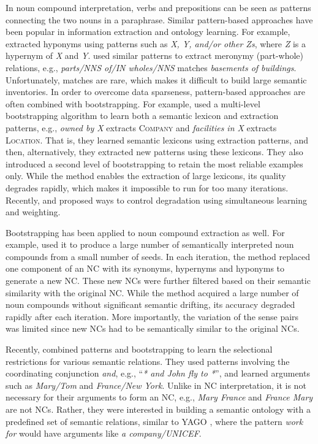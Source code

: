 \documentclass[letterpaper,11pt]{article}
\begin{document}
In noun compound interpretation, verbs and prepositions can be seen as patterns connecting the two nouns in a paraphrase. Similar pattern-based approaches have been popular in  information extraction  and  ontology   learning.
For example,
   extracted hyponyms   using  patterns such as
\textit{X, Y,  and/or other  Zs},
where  \textit{Z} is a hypernym of \textit{X} and \textit{Y}.
 used similar patterns to extract meronymy (part-whole) relations,
e.g., \textit{parts/NNS of/IN wholes/NNS} matches \textit{basements of buildings}.
Unfortunately, matches  are rare,  which makes  it difficult  to build
large  semantic inventories.  In  order to  overcome data  sparseness,
pattern-based approaches are often combined with bootstrapping.
For example,  used a multi-level bootstrapping
algorithm to learn both a semantic lexicon and extraction patterns,
e.g., \textit{owned by X} extracts \textsc{Company}
and \textit{facilities in X} extracts \textsc{Location}.
That is, they learned semantic lexicons using extraction patterns, and
then, alternatively, they extracted new patterns using these lexicons.
They also introduced a second level of bootstrapping to retain
the  most  reliable  examples  only.  While  the  method  enables  the
extraction of large lexicons,
its quality  degrades rapidly,  which makes it impossible  to run
for  too many  iterations.  Recently,   and
  proposed ways  to  control degradation  using
simultaneous learning and weighting.

Bootstrapping has  been applied to  noun compound extraction  as well.
For example,   used it to produce a  large number of
semantically interpreted noun compounds from  a small number of seeds.
In each iteration, the method replaced one component of an NC with its
synonyms, hypernyms and  hyponyms to generate a new NC.  These new NCs
were  further filtered  based on  their semantic  similarity with  the
original  NC.  While  the  method  acquired a  large  number  of  noun
compounds without significant semantic drifting, its accuracy degraded
rapidly  after each  iteration.
More importantly, the variation of the sense pairs was limited
since new NCs had to be semantically similar to the original NCs.

Recently,   combined patterns and bootstrapping
to learn the selectional restrictions for various semantic relations.
They used patterns involving the coordinating conjunction \textit{and},
e.g., ``\textit{*  and John  fly to *}'',  and learned  arguments such
as  \textit{Mary/Tom}  and  \textit{France/New  York}.  Unlike  in  NC
interpretation, it  is not  necessary for their  arguments to  form an
NC,  e.g.,  \textit{Mary  France}  and \textit{France  Mary}  are  not
NCs. Rather,  they were interested in building a semantic  ontology with  a predefined
set  of semantic  relations, similar to  YAGO  \cite{Suchanek:2007}, where
the  pattern \textit{work  for}  would have  arguments like  \textit{a
company/UNICEF}.
\end{document}
